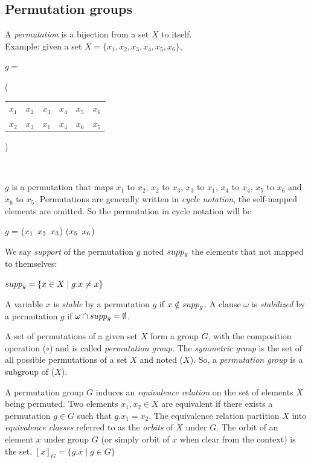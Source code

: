 \subsection{Permutation groups}
A \emph{permutation} is a bijection from a set $X$ to itself.\\
Example: given a set $X = \{x_1, x_2, x_3, x_4, x_5, x_6\}$,
\begin{center}
$g = ${\Bigg( \begin{tabular}{cccccc}
  $x_1$ & $x_2$ & $x_3$ & $x_4$ & $x_5$ & $x_6$\\
  $x_2$ & $x_3$ & $x_1$ & $x_4$ & $x_6$ & $x_5$
 \end{tabular} \Bigg)}\\
\end{center}
$g$ is a permutation that maps $x_1$ to $x_2$, $x_2$ to $x_3$, $x_3$ to $x_1$, $x_4$ to $x_4$, $x_5$ to $x_6$ and $x_6$ to $x_5$.
Permutations are generally written in \emph{cycle notation}, the self-mapped elements are omitted.
So the permutation in cycle notation will be 
\begin{center}
 $g$ = ($x_1 \enskip x_2 \enskip x_3$) ($x_5 \enskip x_6$)
\end{center}
We say \emph{support} of the permutation $g$ noted $supp_{g}$ the elements that not mapped to themselves:
\begin{center}
 $supp_{g} = \{ x \in X \mid g.x \neq x\}$
\end{center}
A variable $x$ is \emph{stable} by a permutation $g$ 
if $x \notin supp_g$. A clause $\omega$ is \emph{stabilized} by a permutation $g$ if 
$\omega \cap supp_g = \emptyset$.

A set of permutations of a given set $X$ form a group $G$,
with the composition operation ($\circ$) and is called \emph{permutation group}.
The \emph{symmetric group} is the set of all possible permutations of a set $X$ and noted \Group($X$).
So, a \emph{permutation group} is a subgroup of \Group($X$). 

A permutation group $G$ induces an \emph{equivalence relation} on the set of elements $X$ being
permuted. Two elements $x_1, x_2 \in X$ are equivalent if there exists a permutation $g \in G$ such that
$g.x_1 = x_2$. The equivalence relation partition $X$ into \emph{equivalence classes} referred to
as the \emph{orbits} of $X$ under $G$. The orbit of an element $x$ under group $G$ (or simply orbit of $x$ when clear
from the context) is the set. $[x]_G = \{g.x \mid g \in G\}$

